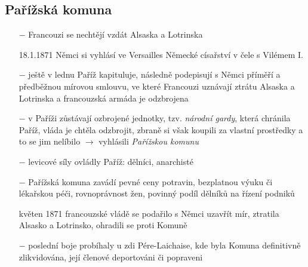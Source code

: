 \documentclass{article}
\begin{document}
\subsection*{Pařížská komuna}
\begin{itemize}
    \vspace{-0.5em}
    \setlength\itemsep{0.15em}
    \item[$-$] Francouzi se nechtějí vzdát Alsaska a Lotrinska
    \item[18.1.1871] Němci si vyhlásí ve Versailles Německé císařství v čele s Vilémem I.
    \item[$-$] ještě v lednu Paříž kapituluje, následně podepisují s Němci příměří a předběžnou mírovou smlouvu, ve které Francouzi uznávají ztrátu Alsaska a Lotrinska a francouzská armáda je odzbrojena
    \item[$-$] v Paříži zůstávají ozbrojené jednotky, tzv. \textit{národní gardy}, která chránila Paříž, vláda je chtěla odzbrojit, zbraně si však koupili za vlastní prostředky a to se jim nelíbilo $\rightarrow$ vyhlásili \textit{Pařížskou komunu}
    \item[$-$] levicové síly ovládly Paříž: dělníci, anarchisté
    \item[$-$] Pařížská komuna zavádí pevné ceny potravin, bezplatnou výuku či lékařskou péči, rovnoprávnost žen, povinný podíl dělníků na řízení podniků
    \item[květen 1871] francouzské vládě se podařilo s Němci uzavřít mír, ztratila Alsasko a Lotrinsko, ohradili se proti Komuně
    \item[$-$] poslední boje probíhaly u zdi Pére-Laichaise, kde byla Komuna definitivně zlikvidována, její členové deportováni či popraveni
\end{itemize}
\end{document}
